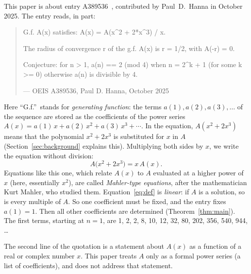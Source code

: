 \documentclass[11pt,a4paper]{article}
\theoremstyle{definition}
\theoremstyle{remark}
\begin{document}
This paper is about entry A389536~\cite{oeis}, contributed by Paul~D.~Hanna in October 2025. The entry reads, in part:
\begin{quote}\small\ttfamily\raggedright G.f. A(x) satisfies: A(x) = A(x\^{}2 + 2*x\^{}3) / x.\par\smallskip The radius of convergence r of the g.f. A(x) is r = 1/2, with A(-r) = 0.\par\smallskip Conjecture: for n > 1, a(n) == 2 (mod 4) when n = 2\^{}k + 1 (for some k >= 0) otherwise a(n) is divisible by 4.\par\smallskip\hfill\textrm{--- OEIS A389536, Paul D. Hanna, October 2025}\end{quote}

Here ``G.f.''\ stands for \emph{generating function}: the terms $a(1),a(2),a(3),\dots$ of the sequence are stored as the
coefficients of the power series $A(x)=a(1)\,x+a(2)\,x^2+a(3)\,x^3+\cdots$. In the equation, $A(x^2+2x^3)$ means that
the polynomial $x^2+2x^3$ is substituted for $x$ in $A$ (Section~\ref{sec:background} explains this). Multiplying both
sides by $x$, we write the equation without division:
\begin{equation}\label{eq:def}
A\bigl(x^2+2x^3\bigr)=x\,A(x).
\end{equation}
Equations like this one, which relate $A(x)$ to $A$ evaluated at a higher power of $x$ (here, essentially $x^2$), are
called \emph{Mahler-type equations}, after the mathematician Kurt Mahler, who studied them. Equation~\eqref{eq:def} is
\emph{linear}: if $A$ is a solution, so is every multiple of $A$. So one coefficient must be fixed, and the entry fixes
$a(1)=1$. Then all other coefficients are determined (Theorem~\ref{thm:main}). The first terms, starting at $n=1$, are
1, 2, 2, 8, 10, 12, 32, 80, 202, 356, 540, 944, \dots

The second line of the quotation is a statement about $A(x)$ as a function of a real or complex number $x$. This paper
treats $A$ only as a formal power series (a list of coefficients), and does not address that statement.
\end{document}
